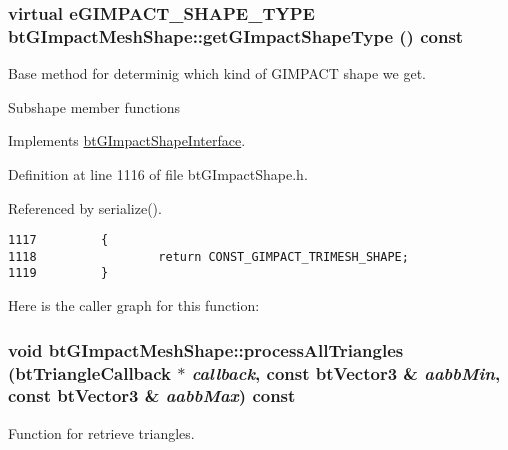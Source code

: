 \hypertarget{classbt_g_impact_mesh_shape_cd958461b4f7802e5bceed2db87c4ff0}{
\subsubsection[getGImpactShapeType]{\setlength{\rightskip}{0pt plus 5cm}virtual eGIMPACT\_\-SHAPE\_\-TYPE btGImpactMeshShape::getGImpactShapeType () const}}
\label{classbt_g_impact_mesh_shape_cd958461b4f7802e5bceed2db87c4ff0}


Base method for determinig which kind of GIMPACT shape we get. 

Subshape member functions 

Implements \hyperlink{classbt_g_impact_shape_interface_25cacbe448997e3f8ec99cb2d4952859}{btGImpactShapeInterface}.

Definition at line 1116 of file btGImpactShape.h.

Referenced by serialize().

\begin{Code}\begin{verbatim}1117         {
1118                 return CONST_GIMPACT_TRIMESH_SHAPE;
1119         }
\end{verbatim}
\end{Code}




Here is the caller graph for this function:\hypertarget{classbt_g_impact_mesh_shape_0b3a0f7b06feb5e2e1fa94f2b5fcd4c7}{
\subsubsection[processAllTriangles]{\setlength{\rightskip}{0pt plus 5cm}void btGImpactMeshShape::processAllTriangles ({\bf btTriangleCallback} $\ast$ {\em callback}, \/  const btVector3 \& {\em aabbMin}, \/  const btVector3 \& {\em aabbMax}) const}}
\label{classbt_g_impact_mesh_shape_0b3a0f7b06feb5e2e1fa94f2b5fcd4c7}


Function for retrieve triangles. 

